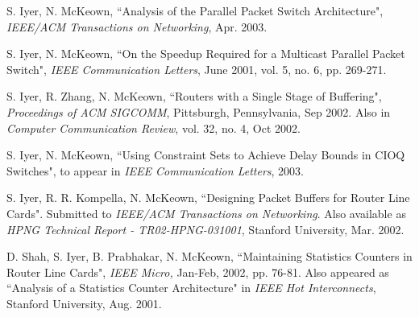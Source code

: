 \documentclass[11pt, a4paper]{article}
\begin{document}
\begin{footnotesize}

\begin{thebibliography}{}


S. Iyer, N. McKeown, ``Analysis of the Parallel Packet Switch Architecture", {\it IEEE/ACM Transactions on Networking}, Apr. 2003.

S. Iyer, N. McKeown, ``On the Speedup Required for a Multicast Parallel Packet Switch",
{\it IEEE Communication Letters}, June 2001, vol. 5, no. 6, pp. 269-271.

S. Iyer, R. Zhang, N. McKeown,
``Routers with a Single Stage of Buffering",
{\it Proceedings of ACM SIGCOMM}, Pittsburgh, Pennsylvania, Sep 2002. Also in
{\it Computer Communication Review}, vol. 32, no. 4, Oct 2002.

S. Iyer, N. McKeown, ``Using Constraint Sets to Achieve Delay Bounds in CIOQ Switches",
to appear in {\it IEEE Communication Letters}, 2003.



S. Iyer, R. R. Kompella, N. McKeown, ``Designing Packet Buffers for
Router Line Cards". Submitted to {\it IEEE/ACM Transactions on
Networking}. Also available as  {\it HPNG Technical Report -
TR02-HPNG-031001}, Stanford University, Mar. 2002.


D. Shah, S. Iyer, B. Prabhakar, N. McKeown,
``Maintaining Statistics Counters in Router Line Cards", {\it IEEE Micro,} Jan-Feb, 2002, pp.
76-81. Also appeared as ``Analysis of a Statistics Counter Architecture"  in {\it IEEE Hot Interconnects}, Stanford University, Aug. 2001.


\end{thebibliography}
\end{footnotesize}
\end{document}
